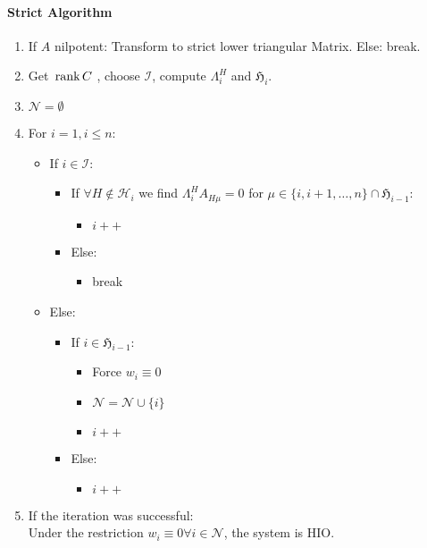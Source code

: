 	\paragraph*{Strict Algorithm}
	\begin{enumerate}
		\item If $A$ nilpotent: Transform to strict lower triangular Matrix. Else: break.
		\item Get $ \, \text{rank}\,C \,\, $, choose $\mathcal{I}$, compute $\Lambda^H_i$ and 
		$\mathfrak{H}_i$.
		\item $\mathcal{N}=\emptyset$
		\item For $i=1,i\leq n$:
			 \begin{itemize}
			 \item[] If $i\in \mathcal{I}$: 
			 	\begin{itemize}
			 	\item[] If $\forall H\notin \mathcal{H}_i$ we find $\Lambda^H_i A_{H\mu}
			 	=0$ 
			 		for $\mu \in\{i,i+1,\ldots,n \}
			 		\cap \mathfrak{H}_{i-1}$:
			 		\begin{itemize}
			 			\item[] $i++$
			 		\end{itemize}
			 	\item[] Else: \begin{itemize}\item[] break \end{itemize}
			 	\end{itemize}
			 \item[] Else:
			 	\begin{itemize}
			 	\item[] If $i\in \mathfrak{H}_{i-1}$:
			 		\begin{itemize} 
			 						\item[] Force $w_i\equiv 0$ 
			 						\item[] $\mathcal{N} = \mathcal{N}\cup \{i\}$
			 						\item[] $i++$			
			 				  \end{itemize}
			 	\item[] Else: 
			 			\begin{itemize}
			 		\item[] $i++$
			 		\end{itemize}
			 	\end{itemize}
			 \end{itemize}
		\item If the iteration was successful:\\
		Under the restriction $w_i\equiv 0 \forall i\in\mathcal{N}$, the system 
		is HIO.
	\end{enumerate}
	
